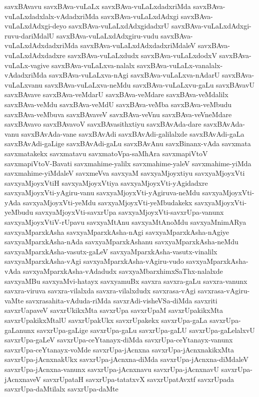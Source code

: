 {savxBAvavu
savxBAva-vuLaLx
savxBAva-vuLaLxdadxriMda
savxBAva-vuLaLxdadxlalx-vAdadxriMda
savxBAva-vuLaLxdAdxgi
savxBAva-vuLaLxdAdxgi-deyo
savxBAva-vuLaLxdAdxgidadxrU
savxBAva-vuLaLxdAdxgi-ruvu-dariMdalU
savxBAva-vuLaLxdAdxgiru-vudu
savxBAva-vuLaLxdAdxdadxriMda
savxBAva-vuLaLxdAdxdadxriMdaleV
savxBAva-vuLaLxdAdxdadxre
savxBAva-vuLaLxdudx
savxBAva-vuLaLxdodxV
savxBAva-vuLaLx-vagive
savxBAva-vuLaLxva-nalalx
savxBAva-vuLaLx-vanalalx-vAdadxriMda
savxBAva-vuLaLxva-nAgi
savxBAva-vuLaLxva-nAdarU
savxBAva-vuLaLxvanu
savxBAva-vuLaLxva-neMdu
savxBAva-vuLaLxvu-gaLu
savxBAvavU
savxBAvave
savxBAva-veMdarU
savxBAva-veMdare
savxBAva-veMdalilx
savxBAva-veMdu
savxBAva-veMdU
savxBAva-veMba
savxBAva-veMbudu
savxBAva-veMbuva
savxBAvaveV
savxBAva-veVnu
savxBAva-veVneMdare
savxBAvavo
savxBAvavoV
savxBAvasithxtiyu
savxBAvAda-dare
savxBAvAda-vanu
savxBAvAda-vane
savxBAvAdi
savxBAvAdi-galilalxde
savxBAvAdi-gaLa
savxBAvAdi-gaLige
savxBAvAdi-gaLu
savxBAvAnu
savxBinanx-vAda
savxmata
savxmatakekx
savxmatavu
savxmatoVpa-saMhAra
savxmapiVtoV
savxmapiVtoV-Bavati
savxmahime-yalilx
savxmahime-yaleV
savxmahime-yiMda
savxmahime-yiMdaleV
savxmeVva
savxyaM
savxyaMjoyxtiyu
savxyaMjoyxVti
savxyaMjoyxVtiH
savxyaMjoyxVtiya
savxyaMjoyxVti-yAgidadxre
savxyaMjoyxVti-yAgiru-vanu
savxyaMjoyxVti-yAgiruva-neMdu
savxyaMjoyxVti-yAda
savxyaMjoyxVti-yeMdu
savxyaMjoyxVti-yeMbudakekx
savxyaMjoyxVti-yeMbudu
savxyaMjoyxVti-savxrUpa
savxyaMjoyxVti-savxrUpa-vanunx
savxyaMjoyxVtiV-rUpavu
savxyaMtAnu
savxyaMtAnoMdu
savxyaMnimARya
savxyaMparxkAsha
savxyaMparxkAsha-nAgi
savxyaMparxkAsha-nAgiye
savxyaMparxkAsha-nAda
savxyaMparxkAshanu
savxyaMparxkAsha-neMdu
savxyaMparxkAsha-vasutx-gaLeV
savxyaMparxkAsha-vasutx-vinalilx
savxyaMparxkAsha-vAgi
savxyaMparxkAsha-vAgiru-vudo
savxyaMparxkAsha-vAda
savxyaMparxkAsha-vAdadudx
savxyaMbarxhimxSaThx-nalalxde
savxyaMBu
savxyaMvi-hatayx
savxyamuBx
savxra
savxra-gaLu
savxra-vanunx
savxra-viruva
savxra-vilalxda
savxra-vilalxdudx
savxrasa-vAgi
savxrasa-vAgiru-vaMte
savxrasahita-vAduda-riMda
savxrAdi-visheVSa-diMda
savxriti
savxrUapaveV
savxrUkikxMta
savxrUpa
savxrUpaM
savxrUpakikxMta
savxrUpakikxMtalU
savxrUpakUkx
savxrUpakekx
savxrUpa-gaLa
savxrUpa-gaLanunx
savxrUpa-gaLige
savxrUpa-gaLu
savxrUpa-gaLU
savxrUpa-gaLelalxvU
savxrUpa-gaLeV
savxrUpa-ceYtanayx-diMda
savxrUpa-ceYtanayx-vanunx
savxrUpa-ceYtanayx-voMde
savxrUpa-jAcnxna
savxrUpa-jAcnxnakikxMta
savxrUpa-jAcnxnakUkx
savxrUpa-jAcnxna-diMda
savxrUpa-jAcnxna-diMdaleV
savxrUpa-jAcnxna-vanunx
savxrUpa-jAcnxnavu
savxrUpa-jAcnxnavU
savxrUpa-jAcnxnaveV
savxrUpataH
savxrUpa-tatatxvX
savxrUpatAvxtf
savxrUpada
savxrUpa-daMtilalx
savxrUpa-daMte
}
